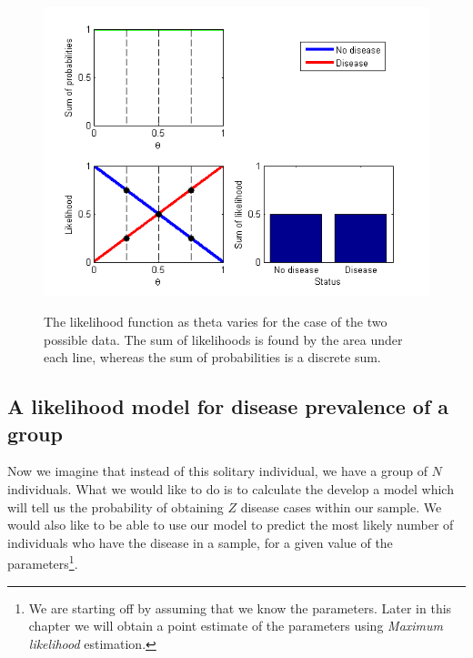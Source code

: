 \documentclass[11pt,fullpage]{book}
\begin{document}
\begin{figure}
\centering
\scalebox{0.75} 
{\includegraphics{likelihood_bernoulli.png}}
\caption{The likelihood function as theta varies for the case of the two possible data. The sum of likelihoods is found by the area under each line, whereas the sum of probabilities is a discrete sum.}\label{fig:Likelihood_bernoulli}
\end{figure}

\subsection{A likelihood model for disease prevalence of a group}\label{sec:Likelihood_diseaseGroup}
Now we imagine that instead of this solitary individual, we have a group of $N$ individuals. What we would like to do is to calculate the develop a model which will tell us the probability of obtaining $Z$ disease cases within our sample. We would also like to be able to use our model to predict the most likely number of individuals who have the disease in a sample, for a given value of the parameters\footnote{We are starting off by assuming that we know the parameters. Later in this chapter we will obtain a point estimate of the parameters using \textit{Maximum likelihood} estimation.}. 
\end{document}
